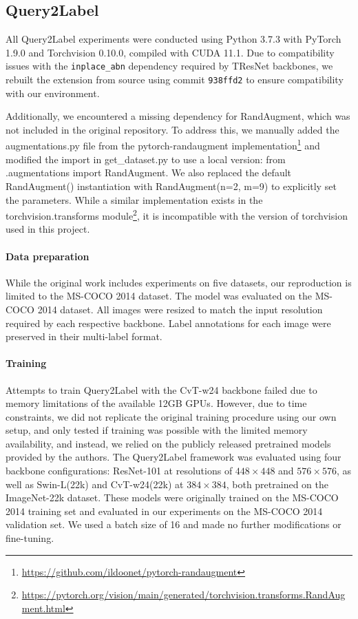 \documentclass[lettersize,journal]{IEEEtran}
\begin{document}
\subsection{Query2Label}
All Query2Label experiments were conducted using Python 3.7.3 with PyTorch 1.9.0 and Torchvision 0.10.0, compiled with CUDA 11.1. Due to compatibility issues with the \texttt{inplace\_abn} dependency required by TResNet backbones, we rebuilt the extension from source using commit \texttt{938ffd2} to ensure compatibility with our environment.

Additionally, we encountered a missing dependency for RandAugment, which was not included in the original repository. To address this, we manually added the augmentations.py file from the pytorch-randaugment implementation\footnote{\url{https://github.com/ildoonet/pytorch-randaugment}} and modified the import in get\_dataset.py to use a local version: from .augmentations import RandAugment. We also replaced the default RandAugment() instantiation with RandAugment(n=2, m=9) to explicitly set the parameters. While a similar implementation exists in the torchvision.transforms module\footnote{\url{https://pytorch.org/vision/main/generated/torchvision.transforms.RandAugment.html}}, it is incompatible with the version of torchvision used in this project.

\paragraph{Data preparation}
While the original work includes experiments on five datasets, our reproduction is limited to the MS-COCO 2014 dataset. The model was evaluated on the MS-COCO 2014 dataset. All images were resized to match the input resolution required by each respective backbone. Label annotations for each image were preserved in their multi-label format.

\paragraph{Training}
Attempts to train Query2Label with the CvT-w24 backbone failed due to memory limitations of the available 12GB GPUs. However, due to time constraints, we did not replicate the original training procedure using our own setup, and only tested if training was possible with the limited memory availability, and instead, we relied on the publicly released pretrained models provided by the authors. The Query2Label framework was evaluated using four backbone configurations: ResNet-101 at resolutions of $448\times448$ and $576\times576$, as well as Swin-L(22k) and CvT-w24(22k) at $384\times384$, both pretrained on the ImageNet-22k \cite{imagenet} dataset. These models were originally trained on the MS-COCO 2014 training set and evaluated in our experiments on the MS-COCO 2014 validation set. We used a batch size of 16 and made no further modifications or fine-tuning.
\end{document}
